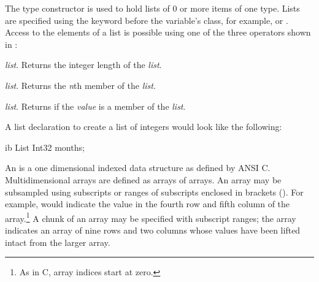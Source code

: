 \begin{description}

 
\item [\class{List}] The  type constructor is used to hold
  lists of 0 or more items of one type. Lists are specified using the
  keyword  before the variable's class, for example,
   or . Access to the elements of a
  list is possible using one of the three operators shown in
  :

  \begin{description}
  
  \item{{\em list}.} Returns the integer length of the
    {\em list}.
  
  \item{{\em list}.} Returns the {\em n}th member of
    the {\em list}.
  
  \item{{\em list}.} Returns  if
    the {\em value} is a member of the {\em list}.

  \end{description}
  
  
  A list declaration to create a list of integers would look like the
  following:

\begin{vcode}{ib}
List Int32 months;
\end{vcode}

\item [\class{Array}] An  is a one dimensional indexed data
  structure as defined by ANSI C\@. Multidimensional arrays are
  defined as arrays of arrays. An array may be subsampled using
  subscripts or ranges of subscripts enclosed in brackets (\lit{()}).
  For example,  would indicate the value in the fourth
  row and fifth column of the  array.\footnote{As in C, \opendap
    array indices start at zero.} A chunk of an array may be specified
  with subscript ranges; the array  indicates an
  array of nine rows and two columns whose values have been lifted
  intact from the larger  array. 
  

\end{description}
